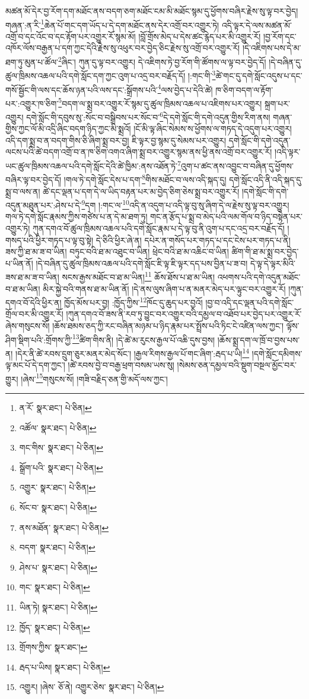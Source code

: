 མཚན་མོ་དེར་བྱ་རོག་དག་མཐོང་ནས་བདག་ཅག་མཐོང་ངམ་མི་མཐོང་སྙམ་དུ་ཕྱོགས་བཞིར་རྗེས་སུ་ལྟ་བར་བྱེད། གཞན་:ན་རི་\footnote{ན་རོ་  སྣར་ཐང་།  པེ་ཅིན། }ཆེན་པོ་གང་དག་ཡོད་པ་དེ་དག་མཐོང་ནས་དེར་འགྲོ་བར་འགྱུར་ཏེ། འདི་ལྟར་དེ་ལས་མཚན་མོ་འགྲོ་བ་དང་འོང་བ་དང་རྟོག་པར་འགྱུར་རོ་སྙམ་མོ། །བློ་གྲོས་མེད་པ་དེས་ཚང་རྙེད་པར་མི་འགྱུར་རོ། །བྱ་རོག་དང་འཁོར་ལོས་བརྒྱན་པ་དག་ཀྱང་དེའི་རྗེས་སུ་འཕུར་བར་བྱེད་ཅིང་རྗེས་སུ་འགྲོ་བར་འགྱུར་རོ། །དེ་འཇིགས་པས་དེ་མ་ཐག་ཏུ་མུན་པ་ཚོལ་\footnote{འཚོལ་  སྣར་ཐང་།  པེ་ཅིན། }ཞིང་། ཀུན་དུ་ལྟ་བར་འགྱུར། དེ་འཇིགས་ཏེ་བྱ་རོག་གི་ཚོགས་ལ་ལྟ་བར་བྱེད་དོ། །དེ་བཞིན་དུ་ཚུལ་ཁྲིམས་འཆལ་པའི་དགེ་སློང་དག་ཀྱང་འུག་པ་འདྲ་བར་བརྗོད་དོ། །:གང་གི་\footnote{གང་གིས་  སྣར་ཐང་།  པེ་ཅིན། }ཚེ་གང་དུ་དགེ་སློང་འདུས་པ་དང་གསོ་སྦྱོང་གི་ལས་དང་ཆོས་ཉན་པའི་ལས་དང་:སྒྲོགས་པའི་\footnote{སྒྲོག་པའི་  སྣར་ཐང་།  པེ་ཅིན། }ལས་བྱེད་པ་དེའི་ཚེ། ཁ་ཅིག་བདག་ལ་རྟོག་པར་:འགྱུར་ཁ་ཅིག་\footnote{འགྱུར་  སྣར་ཐང་།  པེ་ཅིན། }བདག་ལ་སྨྲ་བར་འགྱུར་རོ་སྙམ་དུ་ཚུལ་ཁྲིམས་འཆལ་པ་འཇིགས་པར་འགྱུར། སྐྲག་པར་འགྱུར། དགེ་སློང་གི་དབུས་སུ་:སོང་བ་བསྒྲིབས་པར་སོང་བ་\footnote{སོང་བ་  སྣར་ཐང་།  པེ་ཅིན། }དེ་དགེ་སློང་གི་དགེ་འདུན་གྱིས་རིག་ནས། གཞན་གྱིས་ཀྱང་ལོ་མི་འདྲི་ཞིང་བདག་ཉིད་ཀྱང་མི་སྨྲའོ། །ངོ་མི་ལྟ་ཞིང་སེམས་ས་ཕྱོགས་ལ་གཏད་དེ་འདུག་པར་འགྱུར། འདི་དག་སྨྲ་བ་ན་བདག་གིས་ཅི་ཞིག་སྨྲ་བར་བྱ། ཇི་ལྟར་བྱ་སྙམ་དུ་སེམས་པར་འགྱུར། དགེ་སློང་གི་དགེ་འདུན་ལངས་པའི་ཚེ་བདག་འགྲོ་བ་ན་ཁ་ཅིག་འགའ་ཞིག་སྨྲ་བར་འགྱུར་སྙམ་ནས་ཕྱི་ནས་འགྲོ་བར་འགྱུར་རོ། །འདི་ལྟར་ཡང་ཚུལ་ཁྲིམས་འཆལ་པའི་དགེ་སློང་དེའི་ཚེ་ཁྱིམ་:ནས་འཐོན་ཏེ་\footnote{ནས་མཐོན་  སྣར་ཐང་།  པེ་ཅིན། }འུག་པ་ཚང་ནས་འབྱུང་བ་བཞིན་དུ་ཕྱོགས་བཞིར་ལྟ་བར་བྱེད་དོ། །གལ་ཏེ་དགེ་སློང་དེས་པ་དག་\footnote{བདག་  སྣར་ཐང་།  པེ་ཅིན། }གིས་མཐོང་བ་ལས་འདི་སྐད་དུ། དགེ་སློང་འདི་ནི་འདི་སྐད་དུ་སྨྲ་བ་ལས་ན། ཚེ་དང་ལྡན་པ་དག་དེ་ལ་ཡིད་བརྟན་པར་མ་བྱེད་ཅིག་ཅེས་སྨྲ་བར་འགྱུར་རོ། །དགེ་སློང་གི་དགེ་འདུན་མཐུན་པར་:ཤེས་པ་དེ་\footnote{ཤེས་པ་  སྣར་ཐང་།  པེ་ཅིན། }དག །:གང་ལ་\footnote{གང་  སྣར་ཐང་།  པེ་ཅིན། }འདི་ན་འདུག་པ་འདི་ལྟ་བུ་སུ་ཞིག་དེ་ལ་རྗེས་སུ་ལྟ་བར་འགྱུར། གལ་ཏེ་དགེ་སློང་རྣམས་ཀྱིས་གཙེས་པ་ན་དེ་མ་ཐག་ཏུ། གང་ན་རྩོད་པ་སྨྲ་བ་མེད་པའི་ལམ་གོལ་བ་ཉིད་བསྟེན་པར་འགྱུར་ཏེ། ཀུན་དགའ་བོ་ཚུལ་ཁྲིམས་འཆལ་པའི་དགེ་སློང་རྣམ་པ་དེ་ལྟ་བུ་ནི་འུག་པ་དང་འདྲ་བར་བརྗོད་དོ། །གསད་པའི་ཕྱིར་གཏད་པ་ལྟ་བུ་སྟེ། དེ་ཅིའི་ཕྱིར་ཞེ་ན། དཔེར་ན་གསོད་པར་གཏད་པ་དང་ངེས་པར་གཏད་པ་ནི། ཟས་ཀྱི་ཐ་མ་ཟ་བ་ཡིན། བཏུང་བའི་ཐ་མ་འཐུང་བ་ཡིན། ཕྲེང་བའི་ཐ་མ་འཆིང་བ་ཡིན། ཚིག་གི་ཐ་མ་སྨྲ་བར་བྱེད་པ་ཡིན་ནོ། །དེ་བཞིན་དུ་ཚུལ་ཁྲིམས་འཆལ་པའི་དགེ་སློང་ཇི་ལྟ་ཇི་ལྟར་དད་པས་བྱིན་པ་ཟ་བ། དེ་ལྟ་དེ་ལྟར་མིའི་ཟས་ཐ་མ་ཟ་བ་ཡིན། སངས་རྒྱས་མཐོང་བ་ཐ་མ་ཡིན།\footnote{ཡིན་ཏེ།  སྣར་ཐང་།  པེ་ཅིན། } ཆོས་ཐོས་པ་ཐ་མ་ཡིན། འཕགས་པའི་དགེ་འདུན་མཐོང་བ་ཐ་མ་ཡིན། མིར་སྐྱེ་བའི་གནས་ཐ་མ་ཡིན་ནོ། །དེ་ནས་ལུས་ཞིག་པ་ན་མནར་མེད་པར་ལྟུང་བར་འགྱུར་རོ། །ཀུན་དགའ་བོ་དེའི་ཕྱིར་ན། ཁྱོད་མོས་པར་བྱ། :ཁྱོད་ཀྱིས་\footnote{ཁྱོད་  སྣར་ཐང་།  པེ་ཅིན། }ཁོང་དུ་ཆུད་པར་བྱའོ། །བྱ་བ་འདི་དང་ལྡན་པའི་དགེ་སློང་གྲོལ་བར་མི་འགྱུར་རོ། །ཀུན་དགའ་བོ་ཟས་ནི་རབ་ཏུ་བྱུང་བར་འགྱུར་བའི་དམྱལ་བ་འཐོབ་པར་བྱེད་པར་འགྱུར་རོ་ཞེས་གསུངས་སོ། །ཆོས་ཐམས་ཅད་ཀྱི་རང་བཞིན་མཉམ་པ་ཉིད་རྣམ་པར་སྤྲོས་པའི་ཏིང་ངེ་འཛིན་ལས་ཀྱང་། ལྟོས་ཤིག་སྡིག་པའི་:གྲོགས་ཀྱི་\footnote{གྲོགས་ཀྱིས་  སྣར་ཐང་། }ཚིག་གིས་ནི། །དེ་ཚེ་མ་རུངས་རྒྱལ་པོ་འཆི་དུས་བྱས། །ཆོས་སྨྲ་དག་ལ་ཁྲོ་བ་བྱས་པས་ན། །དེར་ནི་ཚེ་རབས་དྲུག་ཅུར་མནར་མེད་སོང་། །རྒྱལ་རིགས་རྒྱལ་པོ་གང་ཞིག་:རྦད་པ་ཡི།\footnote{རྦད་པ་ཡིས།  སྣར་ཐང་།  པེ་ཅིན། } །དགེ་སློང་དམིགས་ལྟ་མང་པོ་དེ་དག་ཀྱང་། །ཚེ་རབས་བྱེ་བ་བརྒྱ་ཕྲག་བསམ་ཡས་སུ། །སེམས་ཅན་དམྱལ་བའི་སྡུག་བསྔལ་མྱོང་བར་གྱུར། །ཞེས་\footnote{འགྱུར། །ཞེས་  ཅོ་ནེ། འགྱུར་ཅེས་  སྣར་ཐང་།  པེ་ཅིན། }གསུངས་སོ། །གཟི་བརྗིད་ཅན་གྱི་མདོ་ལས་ཀྱང་། 